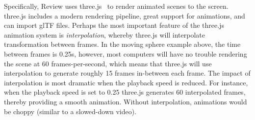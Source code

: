 Specifically, Review uses three.js~\autocite{Cabello.2013.ThreeJS} to render animated scenes to the screen.
%
three.js includes a modern rendering pipeline, great support for animations, and can import glTF files.
%
Perhaps the most important feature of the three.js animation system is \emph{interpolation}, whereby three.js will interpolate transformation between frames.
%
In the moving sphere example above, the time between frames is 0.25s, however, most computers will have no trouble rendering the scene at 60 frames-per-second, which means that three.js will use interpolation to generate roughly 15 frames in-between each frame.
%
The impact of interpolation is most dramatic when the playback speed is reduced. For instance, when the playback speed is set to 0.25 three.js generates 60 interpolated frames, thereby providing a smooth animation.
%
Without interpolation, animations would be choppy (similar to a slowed-down video).
